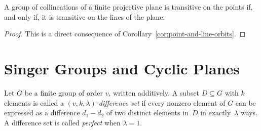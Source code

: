 \begin{cor}\label{cor:point-line-transitivity}
    A group of collineations of a finite projective plane is transitive on the points if, and only if, it is transitive on the lines of the plane.
\end{cor}

\begin{proof}
    This is a direct consequence of Corollary~\ref{cor:point-and-line-orbits}.
    
\end{proof}

\section{Singer Groups and Cyclic Planes}

\begin{defn}
    Let\/ $G$ be a finite group of order\/ $v$, written additively. A subset\/ $D\subseteq G$ with\/ $k$ elements is called a\/ \textsl{$(v,k,\lambda)$-difference set} if every nonzero element of\/ $G$ can be expressed as a difference\/ $d_1 - d_2$ of two distinct elements in\/~$D$ in exactly\/~$\lambda$ ways. A difference set is called \textsl{perfect} when\/ $\lambda = 1$.
\end{defn}

